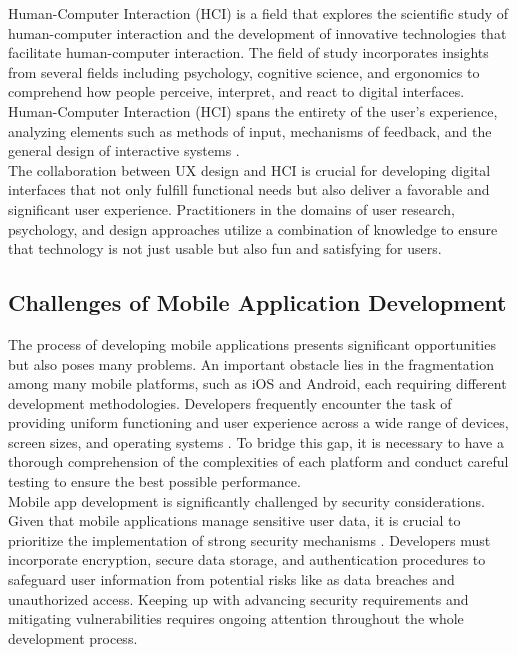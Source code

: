Human-Computer Interaction (HCI) is a field that explores the scientific study of human-computer interaction and the development of innovative technologies that facilitate human-computer interaction. The field of study incorporates insights from several fields including psychology, cognitive science, and ergonomics to comprehend how people perceive, interpret, and react to digital interfaces. Human-Computer Interaction (HCI) spans the entirety of the user's experience, analyzing elements such as methods of input, mechanisms of feedback, and the general design of interactive systems \parencite{olawole18}. \\

The collaboration between UX design and HCI is crucial for developing digital interfaces that not only fulfill functional needs but also deliver a favorable and significant user experience. Practitioners in the domains of user research, psychology, and design approaches utilize a combination of knowledge to ensure that technology is not just usable but also fun and satisfying for users.

\subsection{Challenges of Mobile Application Development}
The process of developing mobile applications presents significant opportunities but also poses many problems. An important obstacle lies in the fragmentation among many mobile platforms, such as iOS and Android, each requiring different development methodologies. Developers frequently encounter the task of providing uniform functioning and user experience across a wide range of devices, screen sizes, and operating systems \parencite{syeed21}. To bridge this gap, it is necessary to have a thorough comprehension of the complexities of each platform and conduct careful testing to ensure the best possible performance. \\

Mobile app development is significantly challenged by security considerations. Given that mobile applications manage sensitive user data, it is crucial to prioritize the implementation of strong security mechanisms \parencite{wambua23}. Developers must incorporate encryption, secure data storage, and authentication procedures to safeguard user information from potential risks like as data breaches and unauthorized access. Keeping up with advancing security requirements and mitigating vulnerabilities requires ongoing attention throughout the whole development process. \\

